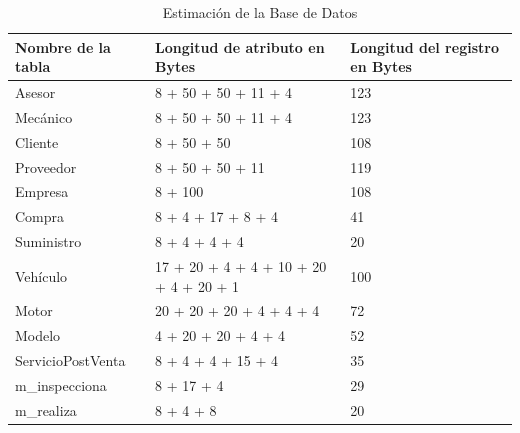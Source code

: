 \documentclass[12pt]{article}
\begin{document}
\begin{table}[h]
    \centering
    \begin{tabular}{|l|p{4cm}|p{4cm}|}
    \hline
    \textbf{Nombre de la tabla} & \textbf{Longitud de atributo en Bytes} & \textbf{Longitud del registro en Bytes} \\ \hline
    Asesor                      & 8 + 50 + 50 + 11 + 4                  & 123                                    \\ \hline
    Mecánico                    & 8 + 50 + 50 + 11 + 4                  & 123                                    \\ \hline
    Cliente                     & 8 + 50 + 50                           & 108                                    \\ \hline
    Proveedor                   & 8 + 50 + 50 + 11                      & 119                                    \\ \hline
    Empresa                     & 8 + 100                               & 108                                    \\ \hline
    Compra                      & 8 + 4 + 17 + 8 + 4                    & 41                                     \\ \hline
    Suministro                  & 8 + 4 + 4 + 4                         & 20                                     \\ \hline
    Vehículo                    & 17 + 20 + 4 + 4 + 10 + 20 + 4 + 20 + 1 & 100                                    \\ \hline
    Motor                       & 20 + 20 + 20 + 4 + 4 + 4              & 72                                     \\ \hline
    Modelo                      & 4 + 20 + 20 + 4 + 4                   & 52                                     \\ \hline
    ServicioPostVenta           & 8 + 4 + 4 + 15 + 4                    & 35                                     \\ \hline
    m\_inspecciona              & 8 + 17 + 4                            & 29                                     \\ \hline
    m\_realiza                  & 8 + 4 + 8                             & 20                                     \\ \hline
    \end{tabular}
    \caption{Estimación de la Base de Datos}
\end{table}
\end{document}
